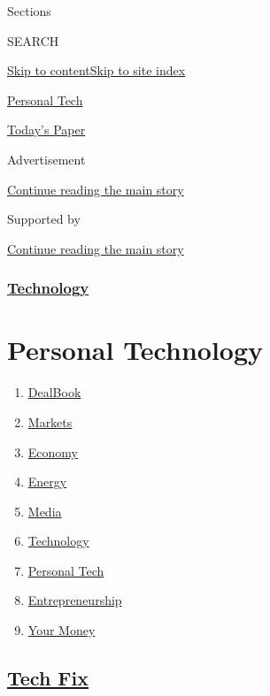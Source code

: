 Sections

SEARCH

\protect\hyperlink{site-content}{Skip to
content}\protect\hyperlink{site-index}{Skip to site index}

\href{https://www.nytimes.com/section/technology/personaltech}{Personal
Tech}

\href{https://myaccount.nytimes.com/auth/login?response_type=cookie\&client_id=vi}{}

\href{https://www.nytimes.com/section/todayspaper}{Today's Paper}

Advertisement

\protect\hyperlink{after-top}{Continue reading the main story}

Supported by

\protect\hyperlink{after-sponsor}{Continue reading the main story}

\hypertarget{technology}{%
\subsubsection{\texorpdfstring{\href{/section/technology}{Technology}}{Technology}}\label{technology}}

\hypertarget{personal-technology}{%
\section{Personal Technology}\label{personal-technology}}

\begin{enumerate}
\def\labelenumi{\arabic{enumi}.}
\tightlist
\item
  \href{/pages/business/dealbook/index.html}{DealBook}
\item
  \href{https://markets.on.nytimes.com}{Markets}
\item
  \href{/section/business/economy}{Economy}
\item
  \href{/section/business/energy-environment}{Energy}
\item
  \href{/section/business/media}{Media}
\item
  \href{/section/technology}{Technology}
\item
  \href{/section/technology/personaltech}{Personal Tech}
\item
  \href{/section/business/smallbusiness}{Entrepreneurship}
\item
  \href{/section/your-money}{Your Money}
\end{enumerate}

\hypertarget{tech-fix}{%
\subsection{\texorpdfstring{\href{/column/tech-fix}{Tech
Fix}}{Tech Fix}}\label{tech-fix}}

